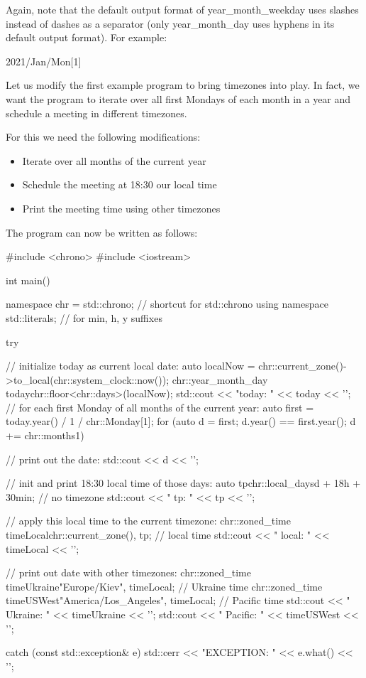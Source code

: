 Again, note that the default output format of year\_month\_weekday uses slashes instead of dashes as a separator (only year\_month\_day uses hyphens in its default output format). For example:

\begin{shell}
2021/Jan/Mon[1]
\end{shell}


Let us modify the first example program to bring timezones into play. In fact, we want the program to iterate over all first Mondays of each month in a year and schedule a meeting in different timezones.

For this we need the following modifications:

\begin{itemize}
\item 
Iterate over all months of the current year

\item 
Schedule the meeting at 18:30 our local time

\item 
Print the meeting time using other timezones
\end{itemize}

The program can now be written as follows:


\begin{cpp}
#include <chrono>
#include <iostream>

int main()
{
	namespace chr = std::chrono; // shortcut for std::chrono
	using namespace std::literals; // for min, h, y suffixes
	
	try {
		// initialize today as current local date:
		auto localNow = chr::current_zone()->to_local(chr::system_clock::now());
		chr::year_month_day today{chr::floor<chr::days>(localNow)};
		std::cout << "today: " << today << '\n';
		// for each first Monday of all months of the current year:
		auto first = today.year() / 1 / chr::Monday[1];
		for (auto d = first; d.year() == first.year(); d += chr::months{1}) {
			// print out the date:
			std::cout << d << '\n';
			
			// init and print 18:30 local time of those days:
			auto tp{chr::local_days{d} + 18h + 30min}; // no timezone
			std::cout << " tp: " << tp << '\n';
			
			// apply this local time to the current timezone:
			chr::zoned_time timeLocal{chr::current_zone(), tp}; // local time
			std::cout << " local: " << timeLocal << '\n';
			
			// print out date with other timezones:
			chr::zoned_time timeUkraine{"Europe/Kiev", timeLocal}; // Ukraine time
			chr::zoned_time timeUSWest{"America/Los_Angeles", timeLocal}; // Pacific time
			std::cout << " Ukraine: " << timeUkraine << '\n';
			std::cout << " Pacific: " << timeUSWest << '\n';
		}
	}
	catch (const std::exception& e) {
		std::cerr << "EXCEPTION: " << e.what() << '\n';
	}
}
\end{cpp}

